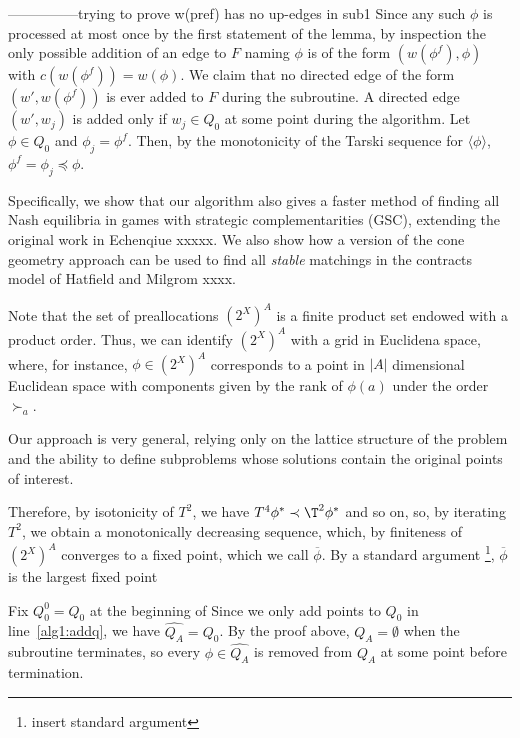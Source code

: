 \documentclass[11pt,reqno]{amsart}
\theoremstyle{definition}
\numberwithin{equation}{section}
\newcommand{\wh}{\widehat}
\newcommand{\ol}{\overline}
\newcommand{\lag}{\langle}
\newcommand{\rag}{\rangle}
\newcommand{\pre}{\phi}
\newcommand{\prealloc}{(2^X)^A}
\newcommand{\peq}{\preceq}
\newcommand{\su}{\succ}
\newcommand{\pe}{\prec}
\newcommand{\toppre}{\ol{\pre}}
\newcommand{\acto}{Q_0}
\newcommand{\acta}{Q_A}
\newcommand{\actacum}{\wh{Q_A}}
\newcommand{\actocum}{\wh{Q_0}}
\newcommand{\forest}{F}
\begin{document}
\begin{enumerate}
---------------trying to prove w(pref) has no up-edges in sub1 
Since any such $\pre$ is processed at most once by the first statement of the lemma, by inspection the only possible addition of an edge to $\forest$ naming $\pre$ is of the form $(w(\pre^f),\pre)$ with $c(w(\pre^f)) = w(\pre)$.  
We claim that no directed edge of the form $(w', w(\pre^f))$ is ever added to $\forest$ during the subroutine. 
A directed edge $(w',w_j)$ is added only if $w_j \in \acto$ at some point during the algorithm. 
Let $\pre \in \acto$ and $\pre_j = \pre^f$. 
Then, by the monotonicity of the Tarski sequence for $\lag \pre \rag$, $\pre^f = \pre_j \peq \pre$.

Specifically, we show that our algorithm also gives a faster method of finding all Nash equilibria in games with strategic complementarities (GSC), extending the original work in Echenqiue xxxxx.  
We also show how a version of the cone geometry approach can be used to find all \emph{stable} matchings in the contracts model of Hatfield and Milgrom xxxx.  

Note that the set of preallocations $\prealloc$ is a finite product set endowed with a product order.
Thus, we can identify $\prealloc$ with a grid in Euclidena space, where, for instance, $\pre \in \prealloc$ corresponds to a point in $|A|$ dimensional Euclidean space with components given by the rank of $\pre(a)$ under the order $\su_a$. 

Our approach is very general, relying only on the lattice structure of the problem and the ability to define subproblems whose solutions contain the original points of interest.  

Therefore, by isotonicity of $T^2$, we have $T^4 \pre^* \pe \T^2 \pre^*$ and so on, so, by iterating $T^2$, we obtain a monotonically decreasing sequence, which, by finiteness of $\prealloc$ converges to a fixed point, which we call $\toppre$.
By a standard argument \footnote{insert standard argument}, $\toppre$ is the largest fixed point 

Fix $\acto^{0} = \acto$ at the beginning of 
Since we only add points to $\acto$ in line~\ref{alg1:addq}, we have $\actacum = \actocum$. 
By the proof above, $\acta = \emptyset$ when the subroutine terminates, so every $\pre \in \actacum$ is removed from $\acta$ at some point before termination.




\end{enumerate}
\end{document}

